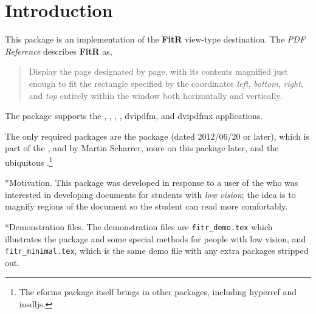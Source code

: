\documentclass{article}
\makeatletter
\let\maketitle\web@maketitle
\renewcommand{\paragraph}
    {\@startsection{paragraph}{4}{0pt}{6pt}{-3pt}
    {\normalfont\normalsize\bfseries}}
\makeatother
\begin{document}
\maketitle

\tableofcontents
{}

\section{Introduction}

This package is an implementation of the \textbf{FitR} view-type
destination. The \textsl{PDF Reference} describes \textbf{FitR} as,
\begin{quote}
    Display the page designated by page, with its contents
    magnified just enough to fit the rectangle specified by the
    coordinates \textsl{left}, \textsl{bottom}, \textsl{right},
    and \textsl{top} entirely within the
    window both horizontally and vertically.
\end{quote}
The package supports the , , ,
, \textsf{dvipdfm}, and \textsf{dvipdfmx} applications.

The only required packages are the  package (dated
2012/06/20 or later), which is part of the , and
 by Martin Scharrer, more on this package later, and
the ubiquitous .\footnote{The \textsf{eforms} package
itself brings in other packages, including \textsf{hyperref} and
\textsf{insdljs}.}

\paragraph*{Motivation.} This package was developed in response to a user of the  who
was interested in developing documents for students with \emph{low vision};
the idea is to magnify regions of the document so the student can read more
comfortably.

\paragraph*{Demonstration files.} The demonstration files are \texttt{fitr\_demo.tex} which
illustrates the package and some special methods for people with low vision,
and \texttt{fitr\_minimal.tex}, which is the same demo file with any extra
packages stripped out.
\end{document}
